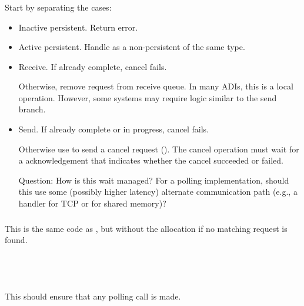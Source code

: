 \documentclass{article}
\begin{document}
\subsubsection{}
\begin{adi3}
\begin{mmadi}
Start by separating the cases:
\begin{itemize}
\item Inactive persistent.  Return error.
\item Active persistent.  Handle as a non-persistent of the same type.
\item Receive.  If already complete, cancel fails.  
\begin{core} 
Otherwise, remove request from receive queue.  In many
ADIs, this is a local operation.  However, some systems may require
logic similar to the send branch.
\end{core}
\item Send. If already complete or in progress, cancel fails.
\begin{core} 
Otherwise use  to send a cancel
request ().  The cancel operation must wait for a
acknowledgement that 
indicates whether the cancel succeeded or failed.  

Question: How is this wait managed?  For a polling implementation, should this
use some (possibly higher latency) alternate communication path (e.g., a
 handler for TCP or  for shared memory)?
\end{core}
\end{itemize}
\end{mmadi}
\end{adi3}

\subsubsection{}
\begin{adi3}
\begin{mmadi}
This is the same code as , but without
the allocation if no matching request is found.
\end{mmadi}
\end{adi3}

\subsubsection{}
\begin{adi3}
\begin{mmadi}
\\
\\
\begin{core}
This should ensure that any polling call is made.
\end{core}
\end{mmadi}
\end{adi3}
\end{document}
